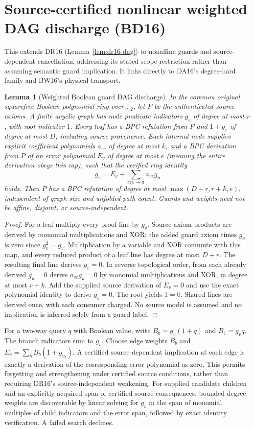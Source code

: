 \documentclass[11pt]{article}
\newtheorem{lemma}[theorem]{Lemma}
\begin{document}
\section{Source-certified nonlinear weighted DAG discharge (BD16)}\label{sec:bd16}
This extends DR16 (Lemma~\ref{lem:dr16-dag}) to nonaffine guards and source-dependent cancellation, addressing its stated scope restriction rather than assuming semantic guard implication. It links directly to DA16's degree-hard family and BW16's physical transport.

\begin{lemma}[Weighted Boolean guard DAG discharge]\label{lem:bd16-weighted}
In the common original squarefree Boolean polynomial ring over $\mathbb F_2$, let $P$ be the authenticated source axioms. A finite acyclic graph has node predicate indicators $g_v$ of degree at most $r$, with root indicator $1$. Every leaf has a BPC refutation from $P$ and $1+g_v$ of degree at most $D$, including source provenance. Each internal node supplies explicit coefficient polynomials $a_{ve}$ of degree at most $k$, and a BPC derivation from $P$ of an error polynomial $E_v$ of degree at most $e$ (meaning the entire derivation obeys this cap), such that the verified ring identity
\[
g_v=E_v+\sum_{e:v\to u}a_{ve}g_u
\]
holds. Then $P$ has a BPC refutation of degree at most $\max(D+r,r+k,e)$, independent of graph size and unfolded path count. Guards and weights need not be affine, disjoint, or source-independent.
\end{lemma}
\begin{proof}
For a leaf multiply every proof line by $g_v$. Source axiom products are derived by monomial multiplications and XOR; the added guard axiom times $g_v$ is zero since $g_v^2=g_v$. Multiplication by a variable and XOR commute with this map, and every reduced product of a leaf line has degree at most $D+r$. The resulting final line derives $g_v=0$. In reverse topological order, from each already derived $g_u=0$ derive $a_{ve}g_u=0$ by monomial multiplications and XOR, in degree at most $r+k$. Add the supplied source derivation of $E_v=0$ and use the exact polynomial identity to derive $g_v=0$. The root yields $1=0$. Shared lines are derived once, with each consumer charged. No source model is assumed and no implication is inferred solely from a guard label.
\end{proof}

For a two-way query $q$ with Boolean value, write $B_0=g_v(1+q)$ and $B_1=g_v q$. The branch indicators sum to $g_v$. Choose edge weights $B_b$ and $E_v=\sum_b B_b(1+g_{u_b})$. A certified source-dependent implication at each edge is exactly a derivation of the corresponding error polynomial as zero. This permits forgetting and strengthening under certified source conditions, rather than requiring DR16's source-independent weakening. For supplied candidate children and an explicitly acquired span of certified source consequences, bounded-degree weights are discoverable by linear solving for $g_v$ in the span of monomial multiples of child indicators and the error span, followed by exact identity verification. A failed search declines.
\end{document}
